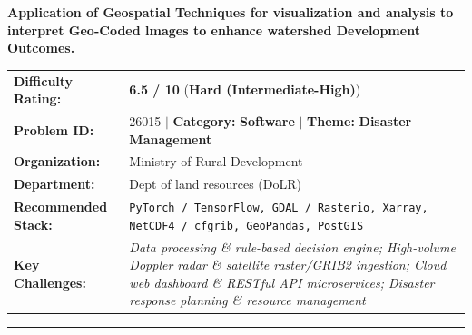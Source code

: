 \documentclass[10pt,a4paper]{article}
\begin{document}
\begin{tcolorbox}[pscard, title={"\textbf{SIH26015} \quad $\vert$ \quad Application of Geospatial Techniques for visualization and analysis to inte...}]
\textbf{\large Application of Geospatial Techniques for visualization and analysis to interpret Geo-Coded lmages to enhance watershed Development Outcomes.}\\[0.25cm]

\begin{tabular}{@{}lp{12.5cm}@{}}
\textbf{Difficulty Rating:} & \textcolor{diffhard}{\textbf{\Large 6.5 / 10}} \quad (\textbf{Hard (Intermediate-High)}) \\
\textbf{Problem ID:} & 26015 \quad $\vert$ \quad \textbf{Category:} \textbf{Software} \quad $\vert$ \quad \textbf{Theme:} \textbf{Disaster Management} \\
\textbf{Organization:} & Ministry of Rural Development \\
\textbf{Department:} & Dept of land resources (DoLR) \\
\textbf{Recommended Stack:} & \texttt{PyTorch / TensorFlow, GDAL / Rasterio, Xarray, NetCDF4 / cfgrib, GeoPandas, PostGIS} \\
\textbf{Key Challenges:} & \textit{\small Data processing \& rule-based decision engine; High-volume Doppler radar \& satellite raster/GRIB2 ingestion; Cloud web dashboard \& RESTful API microservices; Disaster response planning \& resource management} \\
\end{tabular}

\vspace{0.2cm}
\hrule
\vspace{0.2cm}


\end{tcolorbox}
\end{document}
